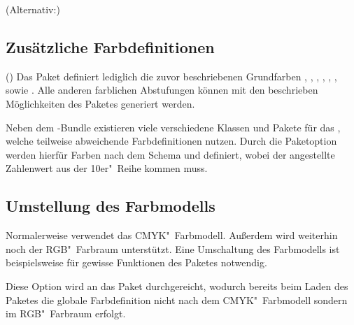 \begin{DeclareEntity}{}
\begin{Declaration}
  {}
  (Alternativ:)
\printdeclarationlist
{}
%
\end{Declaration}



\subsection{Zusätzliche Farbdefinitionen}
%
\begin{Declaration}
  {}
  ()
\printdeclarationlist
%
Das Paket  definiert lediglich die zuvor beschriebenen 
Grundfarben , , , , 
, ,  sowie . 
Alle anderen farblichen Abstufungen können mit den beschrieben Möglichkeiten 
des Paketes  generiert werden.
\end{Declaration}

\begin{Declaration}
  {}
\printdeclarationlist
%
Neben dem \TUDScript-Bundle existieren viele verschiedene Klassen und Pakete 
für das \CD, welche teilweise abweichende Farbdefinitionen nutzen. Durch die 
Paketoption  werden hierfür Farben nach dem Schema 
 und  definiert, wobei 
der angestellte Zahlenwert aus der 10er"~Reihe kommen muss.
\end{Declaration}



\subsection{%
  Umstellung des Farbmodells%
}
%
Normalerweise verwendet  das CMYK"~Farbmodell. Außerdem 
wird weiterhin noch der RGB"~Farbraum unterstützt. Eine Umschaltung des 
Farbmodells ist beispielsweise für gewisse Funktionen des Paketes 
 notwendig.

\begin{Declaration}
  {}
\printdeclarationlist
%
Diese Option wird an das Paket  durchgereicht, wodurch bereits 
beim Laden des Paketes die globale Farbdefinition nicht nach dem 
CMYK"~Farbmodell sondern im RGB"~Farbraum erfolgt.
\end{Declaration}


\end{DeclareEntity}
